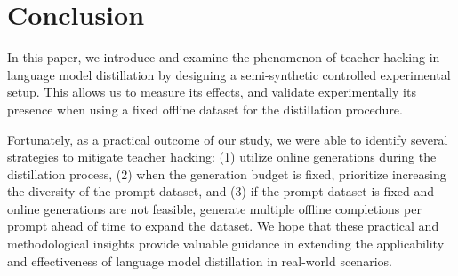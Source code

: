 \section{Conclusion}\label{sec:conclusion}
In this paper, we introduce and examine the phenomenon of teacher hacking in language model distillation by designing a semi-synthetic controlled experimental setup. This allows us to measure its effects, and validate experimentally its presence when using a fixed offline dataset for the distillation procedure. 

Fortunately, as a practical outcome of our study, we were able to identify several strategies to mitigate teacher hacking: (1) utilize online generations during the distillation process, (2) when the generation budget is fixed, prioritize increasing the diversity of the prompt dataset, and (3) if the prompt dataset is fixed and online generations are not feasible, generate multiple offline completions per prompt ahead of time to expand the dataset. We hope that these practical and methodological insights provide valuable guidance in extending the applicability and effectiveness of language model distillation in real-world scenarios.